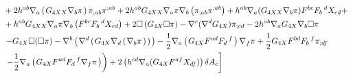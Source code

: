 \documentclass[12pt,a4paper,svgnames]{extarticle}
\newcommand\brwrap[3]{%
  \setbox0=\hbox{$#2$}
  \left#1\vbox to \the\ht0{\hbox to 0pt{}}\right.\kern-.2em
  \begingroup #2\endgroup\kern-.15em
  \left.\vbox to \the\ht0{\hbox to 0pt{}}\right#3
}
\begin{document}
\begin{footnotesize}
\begin{align*}
	&+2h^{a b} \nabla_{a}\brwrap{(}{G_{4XX} \nabla_{b}{\pi}}{)} \pi_{;a b}\pi^{;a b} +2h^{a b} G_{4XX} \nabla_{a}{\pi}\nabla_{b}\left(\pi_{;a b}\pi^{;a b}\right) +h^{a b} \nabla_{a}(G_{4XX} \nabla_{b}{\pi}) F^{b c} F_{b}\,^{d} X_{c d} +\\
	&  +h^{a b} G_{4XX} \nabla_{a}{\pi} \nabla_{b}\left(F^{b c} F_{b}\,^{d} X_{c d}\right) +2 \Box\left(G_{4X} \Box{\pi}\right) -\nabla^{c}(\nabla^{d}{G_{4X}}) \pi_{;c d} -2h^{a b}\nabla_{a}{G_{4X}} \nabla_{b}{\Box{\pi}}\\
	& \left. -G_{4X} \Box(\Box{\pi}) - \nabla^{b}\brwrap{(}{\nabla^{d}\brwrap{(}{G_{4X} \nabla_{d}\brwrap{(}{\nabla_{b}{\pi}}{)}}{)}}{)} -\frac{1}{2} \nabla_{a}\brwrap{(}{G_{4X} F^{a d} F_{d}\,^{f}}{)} \nabla_{f}{\pi} +\frac{1}{2}G_{4X} F^{b d} F_{b}\,^{f} \pi_{;d f}  \right.\\
	&\left.\left.- \frac{1}{2} \nabla_{a}\brwrap{(}{G_{4X} F^{a d} F_{d}\,^{f} \nabla_{f}{\pi}})\right) +2\left( h^{c d} \nabla_{a}{(G_{4X}} F^{a f} X_{d f})\right)\delta A_{c}  \right]  
\end{align*}
\end{footnotesize}
\end{document}

